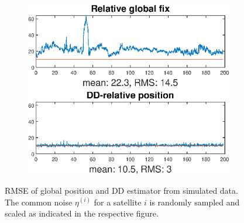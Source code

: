 \begin{figure}[!htb]\ContinuedFloat
\begin{subfigure}{\textwidth}
\includegraphics[width=\textwidth]{Results/MSEplots/Esim20.eps}
\end{subfigure}
\caption{RMSE of global position and DD estimator from simulated data. The common noise $\eta^{(i)}$ for a satellite $i$ is randomly sampled and scaled as indicated in the respective figure.}
\end{figure}


